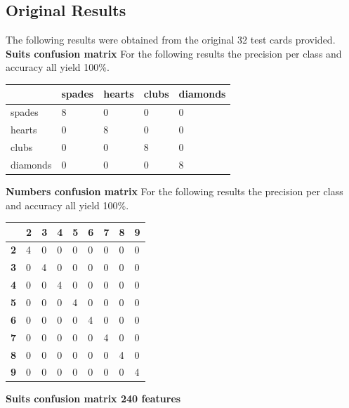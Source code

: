 \documentclass[11pt]{article}
\theoremstyle{plain}
\theoremstyle{definition}
\begin{document}
\subsection{Original Results}
The following results were obtained from the original 32 test cards provided.
\newline
\newline
{\bf Suits confusion matrix}
\newline
For the following results the precision per class and accuracy all yield 100\%.
 \begin{center}
    \begin{tabular}{| l | l |  l | l | p{2cm} |}
    \hline
      & spades & hearts & clubs &diamonds \\ \hline
 	   spades & 8 & 0 & 0 &0\\ \hline
 	   hearts & 0 & 8 & 0 &0\\ \hline
 	   clubs & 0 & 0 & 8 &0\\ \hline
 	   diamonds & 0 & 0 & 0&8\\ \hline
    \end{tabular}
 \end{center}
{\bf Numbers confusion matrix}
\newline
For the following results the precision per class and accuracy all yield 100\%.
\begin{center}
    \begin{tabular}{| l | l |  l | l |  l | l |  l | l |p{1cm} |}
    \hline
      & {\bf2} & {\bf3} & {\bf4} &{\bf5} &{\bf6} &{\bf7}&{\bf8}&{\bf9}\\ \hline
 	   {\bf2} & 4 & 0 &0  & 0 & 0 &  0&0 &0\\ \hline
 	   {\bf3} & 0 & 4 &  0& 0 &0  & 0 &0 &0\\ \hline
 	   {\bf4} & 0 & 0 & 4 &  0& 0 &  0& 0&0\\ \hline
 	   {\bf5} & 0 & 0 & 0 & 4 &  0& 0 & 0&0\\ \hline
 	   {\bf6} & 0 & 0 & 0 & 0 &4  & 0 &0 &0\\ \hline
 	   {\bf7} & 0 & 0 & 0 & 0 & 0 &4  & 0&0\\ \hline
 	   {\bf8} & 0 & 0 & 0 & 0 & 0 &0  &4 &0\\ \hline
 	   {\bf9 }& 0 & 0 & 0 & 0 & 0 &0  &0 &4\\ \hline
    \end{tabular}
 \end{center}
 \newpage
{\bf Suits confusion matrix 240 features}
\end{document}
